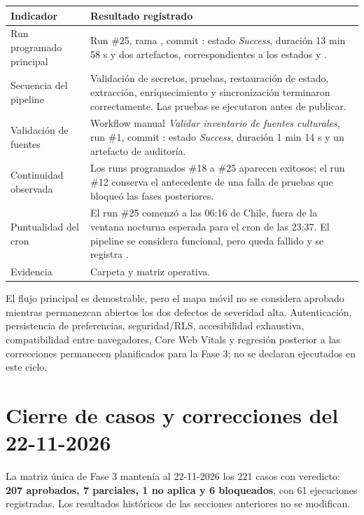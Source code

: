 \documentclass[11pt,a4paper]{article}
\begin{document}
\begin{longtable}{@{}L{5.1cm}L{9.7cm}@{}}
\toprule
\textbf{Indicador} & \textbf{Resultado registrado} \\
\midrule
\endhead
Run programado principal & Run \#25, rama , commit : estado \emph{Success}, duración 13 min 58 s y dos artefactos, correspondientes a los estados  y . \\
Secuencia del pipeline & Validación de secretos, pruebas, restauración de estado, extracción, enriquecimiento y sincronización terminaron correctamente. Las pruebas se ejecutaron antes de publicar. \\
Validación de fuentes & Workflow manual \emph{Validar inventario de fuentes culturales}, run \#1, commit : estado \emph{Success}, duración 1 min 14 s y un artefacto de auditoría. \\
Continuidad observada & Los runs programados \#18 a \#25 aparecen exitosos; el run \#12 conserva el antecedente de una falla de pruebas que bloqueó las fases posteriores. \\
Puntualidad del cron & El run \#25 comenzó a las 06:16 de Chile, fuera de la ventana nocturna esperada para el cron de las 23:37. El pipeline se considera funcional, pero  queda fallido y se registra . \\
Evidencia & Carpeta  y matriz operativa. \\
\bottomrule
\end{longtable}

El flujo principal es demostrable, pero el mapa móvil no se considera aprobado mientras
permanezcan abiertos los dos defectos de severidad alta. Autenticación, persistencia de
preferencias, seguridad/RLS, accesibilidad exhaustiva, compatibilidad entre navegadores,
Core Web Vitals y regresión posterior a las correcciones permanecen planificados para la
Fase 3; no se declaran ejecutados en este ciclo.

\section{Cierre de casos y correcciones del 22-11-2026}

La matriz única de Fase 3 mantenía al 22-11-2026 los 221 casos con veredicto: \textbf{207 aprobados,
7 parciales, 1 no aplica y 6 bloqueados}, con 61 ejecuciones registradas. Los resultados
históricos de las secciones anteriores no se modifican.
\end{document}
